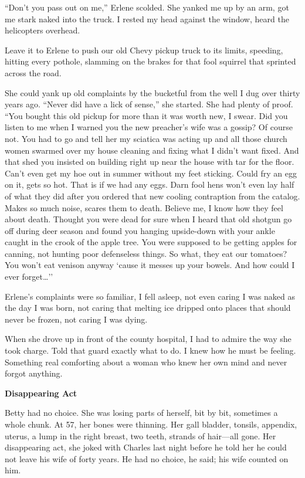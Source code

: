 \documentclass[
]{article}
\begin{document}
``Don't you pass out on me,'' Erlene scolded. She yanked me up by an
arm, got me stark naked into the truck. I rested my head against the
window, heard the helicopters overhead.

Leave it to Erlene to push our old Chevy pickup truck to its limits,
speeding, hitting every pothole, slamming on the brakes for that fool
squirrel that sprinted across the road.

She could yank up old complaints by the bucketful from the well I dug
over thirty years ago. ``Never did have a lick of sense,'' she started.
She had plenty of proof. ``You bought this old pickup for more than it
was worth new, I swear. Did you listen to me when I warned you the new
preacher's wife was a gossip? Of course not. You had to go and tell her
my sciatica was acting up and all those church women swarmed over my
house cleaning and fixing what I didn't want fixed. And that shed you
insisted on building right up near the house with tar for the floor.
Can't even get my hoe out in sum­mer without my feet sticking. Could fry
an egg on it, gets so hot. That is if we had any eggs. Darn fool hens
won't even lay half of what they did after you ordered that new cooling
contraption from the cata­log. Makes so much noise, scares them to
death. Believe me, I know how they feel about death. Thought you were
dead for sure when I heard that old shotgun go off during deer season
and found you hanging upside-down with your ankle caught in the crook of
the apple tree. You were supposed to be getting apples for canning, not
hunting poor defenseless things. So what, they eat our tomatoes? You
won't eat venison anyway `cause it messes up your bowels. And how could
I ever forget\ldots''

Erlene's complaints were so familiar, I fell asleep, not even caring I
was naked as the day I was born, not caring that melting ice dripped
onto places that should never be frozen, not caring I was dying.

When she drove up in front of the county hospital, I had to admire the
way she took charge. Told that guard exactly what to do. I knew how he
must be feeling. Something real comforting about a woman who knew her
own mind and never forgot anything.

\textbf{\hfill\break
}

\textbf{Disappearing Act}

Betty had no choice. She was losing parts of herself, bit by bit,
sometimes a whole chunk. At 57, her bones were thinning. Her gall
bladder, tonsils, appendix, uterus, a lump in the right breast, two
teeth, strands of hair---all gone. Her disappearing act, she joked with
Charles last night before he told her he could not leave his wife of
forty years. He had no choice, he said; his wife counted on him.
\end{document}
